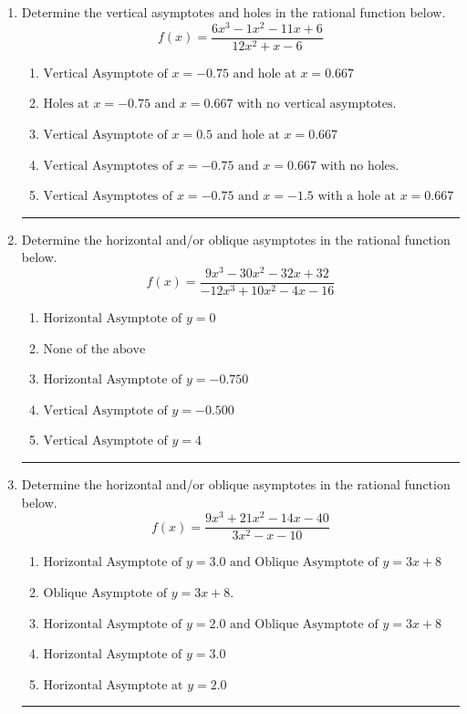 \documentclass[14pt]{extbook}
\newcommand{\litem}[1]{\item#1\hspace*{-1cm}\rule{\textwidth}{0.4pt}}
\begin{document}
\begin{enumerate}
\litem{
Determine the vertical asymptotes and holes in the rational function below.\[ f(x) = \frac{6x^{3} -1 x^{2} -11 x + 6}{12x^{2} +x -6} \]\begin{enumerate}[label=\Alph*.]
\item \( \text{Vertical Asymptote of } x = -0.75 \text{ and hole at } x = 0.667 \)
\item \( \text{Holes at } x = -0.75 \text{ and } x = 0.667 \text{ with no vertical asymptotes.} \)
\item \( \text{Vertical Asymptote of } x = 0.5 \text{ and hole at } x = 0.667 \)
\item \( \text{Vertical Asymptotes of } x = -0.75 \text{ and } x = 0.667 \text{ with no holes.} \)
\item \( \text{Vertical Asymptotes of } x = -0.75 \text{ and } x = -1.5 \text{ with a hole at } x = 0.667 \)

\end{enumerate} }
\litem{
Determine the horizontal and/or oblique asymptotes in the rational function below.\[ f(x) = \frac{9x^{3} -30 x^{2} -32 x + 32}{-12x^{3} +10 x^{2} -4 x -16} \]\begin{enumerate}[label=\Alph*.]
\item \( \text{Horizontal Asymptote of } y = 0  \)
\item \( \text{None of the above} \)
\item \( \text{Horizontal Asymptote of } y = -0.750  \)
\item \( \text{Vertical Asymptote of } y = -0.500  \)
\item \( \text{Vertical Asymptote of } y = 4  \)

\end{enumerate} }
\litem{
Determine the horizontal and/or oblique asymptotes in the rational function below.\[ f(x) = \frac{9x^{3} +21 x^{2} -14 x -40}{3x^{2} -x -10} \]\begin{enumerate}[label=\Alph*.]
\item \( \text{Horizontal Asymptote of } y = 3.0 \text{ and Oblique Asymptote of } y = 3x + 8 \)
\item \( \text{Oblique Asymptote of } y = 3x + 8. \)
\item \( \text{Horizontal Asymptote of } y = 2.0 \text{ and Oblique Asymptote of } y = 3x + 8 \)
\item \( \text{Horizontal Asymptote of } y = 3.0  \)
\item \( \text{Horizontal Asymptote at } y = 2.0 \)


\end{enumerate}}
\end{enumerate}
\end{document}
